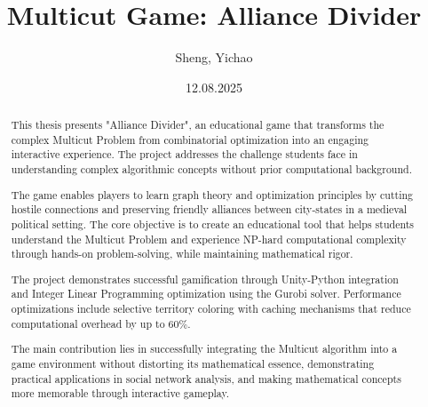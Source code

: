 \documentclass[english]{tudscrreprt}
\begin{document}
\title{%
  Multicut Game: Alliance Divider
}
\renewcommand{\graduationtext}{}
\author{%
  Sheng, Yichao%
}
\date{12.08.2025}
\makecover
\maketitle

\newcommand{\taskcontent}{%
  The Multicut Game project aims to transform the complex combinatorial optimization
  problem of graph partitioning into an engaging educational game experience.
  The project focuses on developing an interactive game called "Alliance Divider" that teaches players
  about the Multicut Problem while providing an optimal solution using Integer
  Linear Programming (ILP) with Gurobi solver.

  The main objectives include creating an intuitive game interface that
  represents city-states as nodes and their relationships as weighted edges,
  implementing the core gameplay mechanics of cutting hostile ties while
  preserving friendly alliances, and developing a robust technical architecture
  that bridges Unity game engine with Python optimization algorithms.
}


\begin{abstract}
  This thesis presents "Alliance Divider", an educational game that transforms the complex Multicut Problem from combinatorial optimization into an engaging interactive experience. The project addresses the challenge students face in understanding complex algorithmic concepts without prior computational background.

  The game enables players to learn graph theory and optimization principles by cutting hostile connections and preserving friendly alliances between city-states in a medieval political setting. The core objective is to create an educational tool that helps students understand the Multicut Problem and experience NP-hard computational complexity through hands-on problem-solving, while maintaining mathematical rigor.

  The project demonstrates successful gamification through Unity-Python integration and Integer Linear Programming optimization using the Gurobi solver. Performance optimizations include selective territory coloring with caching mechanisms that reduce computational overhead by up to 60\%.

  The main contribution lies in successfully integrating the Multicut algorithm into a game environment without distorting its mathematical essence, demonstrating practical applications in social network analysis, and making mathematical concepts more memorable through interactive gameplay.
\end{abstract}
\end{document}
